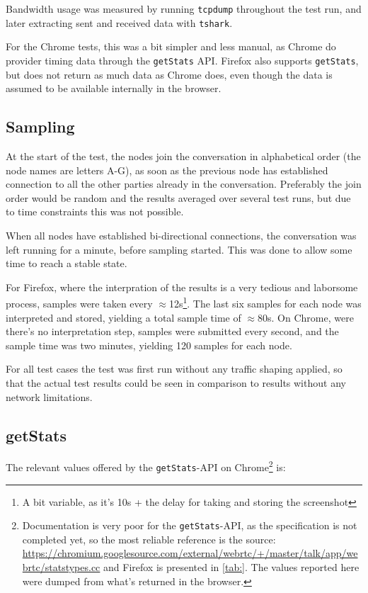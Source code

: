 Bandwidth usage was measured by running \texttt{tcpdump} throughout the test run, and later extracting sent and received data with \texttt{tshark}.

For the Chrome tests, this was a bit simpler and less manual, as Chrome do provider timing data through the \texttt{getStats} API. Firefox also supports \texttt{getStats}, but does not return as much data as Chrome does, even though the data is assumed to be available internally in the browser.


\subsection{Sampling}

At the start of the test, the nodes join the conversation in alphabetical order (the node names are letters A-G), as soon as the previous node has established connection to all the other parties already in the conversation. Preferably the join order would be random and the results averaged over several test runs, but due to time constraints this was not possible.

When all nodes have established bi-directional connections, the conversation was left running for a minute, before sampling started. This was done to allow some time to reach a stable state.

For Firefox, where the interpration of the results is a very tedious and laborsome process, samples were taken every $\approx$12s\footnote{A bit variable, as it's 10s + the delay for taking and storing the screenshot}. The last six samples for each node was interpreted and stored, yielding a total sample time of $\approx$80s. On Chrome, were there's no interpretation step, samples were submitted every second, and the sample time was two minutes, yielding 120 samples for each node.

For all test cases the test was first run without any traffic shaping applied, so that the actual test results could be seen in comparison to results without any network limitations.


\subsection{getStats}

The relevant values offered by the \texttt{getStats}-API on Chrome\footnote{Documentation is very poor for the \texttt{getStats}-API, as the specification is not completed yet, so the most reliable reference is the source: \url{https://chromium.googlesource.com/external/webrtc/+/master/talk/app/webrtc/statstypes.cc} and Firefox is presented in \autoref{tab:}. The values reported here were dumped from what's returned in the browser.} is:

